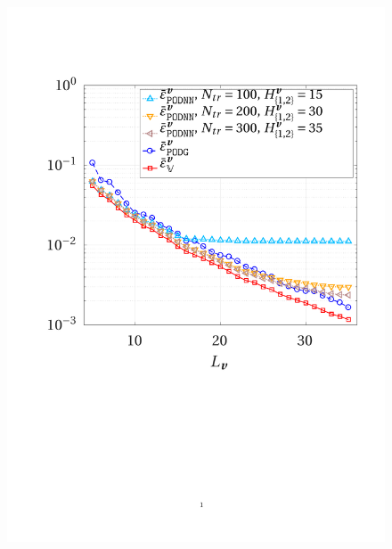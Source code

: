 \documentclass{elsarticle}
\numberwithin{equation}{section}
\theoremstyle{theorem}
\theoremstyle{definition}
\theoremstyle{remark}
\theoremstyle{proposition}
\numberwithin{figure}{section}
\begin{document}
		\begin{figure}[t!]
			\center
			\includegraphics[scale = 0.4, trim = {2cm 9cm 1.5cm 3.5cm}, clip]{dc_200_vel_error_vs_rank}
			\hspace*{1cm}

\end{figure}
\end{document}
